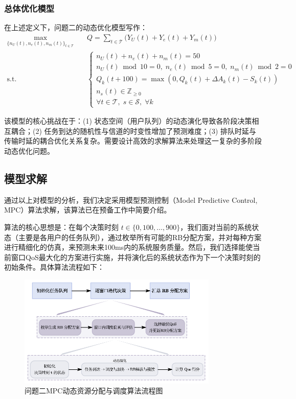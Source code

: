 \subsubsection{总体优化模型}
在上述定义下，问题二的动态优化模型写作：
\begin{equation}
\label{eq:q2_obj}
\begin{aligned}
\max_{\{n_U(t),n_e(t),n_m(t)\}_{t\in\mathcal{T}}}\quad & Q=\sum_{t\in\mathcal{T}}\Big( Y_U(t)+Y_e(t)+Y_m(t) \Big) \\
\text{s.t.} \quad & \begin{cases}
  n_U(t) + n_e(t) + n_m(t) = 50\\
  n_U(t) \bmod 10 = 0,\; n_e(t) \bmod 5 = 0,\; n_m(t) \bmod 2 = 0\\
  Q_k(t+100) = \max\!\left(0, Q_k(t) + \Delta A_k(t) - S_k(t)\right) \\
  n_s(t) \in \mathbb{Z}_{\ge 0}\\
  \forall t \in \mathcal{T},\;s \in \mathcal{S},\; \forall k
  \end{cases}
  \end{aligned}
\end{equation}

该模型的核心挑战在于：(1) 状态空间（用户队列）的动态演化导致各阶段决策相互耦合；(2) 任务到达的随机性与信道的时变性增加了预测难度；(3) 排队时延与传输时延的耦合优化关系复杂。需要设计高效的求解算法来处理这一复杂的多阶段动态优化问题。

\subsection{模型求解}

通过以上对模型的分析，我们决定采用模型预测控制（Model Predictive Control, MPC）算法求解，该算法已在预备工作中简要介绍。

算法的核心思想是：在每个决策时刻 $t \in \{0, 100, \dots, 900\}$，我们面对当前的系统状态（主要是各用户的任务队列），通过枚举所有可能的RB分配方案，并对每种方案进行精细化的仿真，来预测未来100ms内的系统服务质量。然后，我们选择能使当前窗口QoS最大化的方案进行实施，并将演化后的系统状态作为下一个决策时刻的初始条件。具体算法流程如下：
\begin{figure}[H]
    \centering
    \includegraphics[width=0.85\textwidth]{figures/第二问算法.pdf}
    \caption{问题二MPC动态资源分配与调度算法流程图}
    \label{fig:q2_algorithm_flow}
\end{figure}

